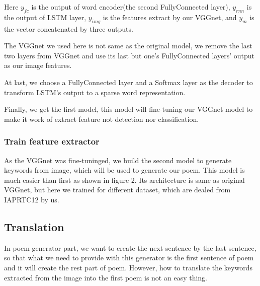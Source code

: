 \documentclass[10pt,twocolumn,letterpaper]{article}
\begin{document}
Here $y_{fc}$ is the output of word encoder(the second FullyConnected layer), $y_{rnn}$ is the output of LSTM layer, $y_{img}$ is the features extract by our VGGnet, and $y_{m}$ is the vector concatenated by three outputs.

The VGGnet we used here is not same as the original model, we remove the last two layers from VGGnet and use its last but one’s FullyConnected layers’ output as our image features.

At last, we choose a FullyConnected layer and a Softmax layer as the decoder to transform LSTM’s output to a sparse word representation.

Finally, we get the first model, this model will fine-tuning our VGGnet model to make it work of extract feature not detection nor classification.

\subsubsection{Train feature extractor}
As the VGGnet was fine-tuninged, we build the second model to generate keywords from image, which will be used to generate our poem. This model is much easier than first as shown in figure 2. Its architecture is same as original VGGnet, but here we trained for different dataset, which are dealed from IAPRTC12 by us.



\subsection{Translation}
In poem generator part, we want to create the next sentence by the last sentence, so that what we need to provide with this generator is the first sentence of poem and it will create the rest part of poem. However, how to translate the keywords extracted from the image into the first poem is not an easy thing. 
\end{document}
